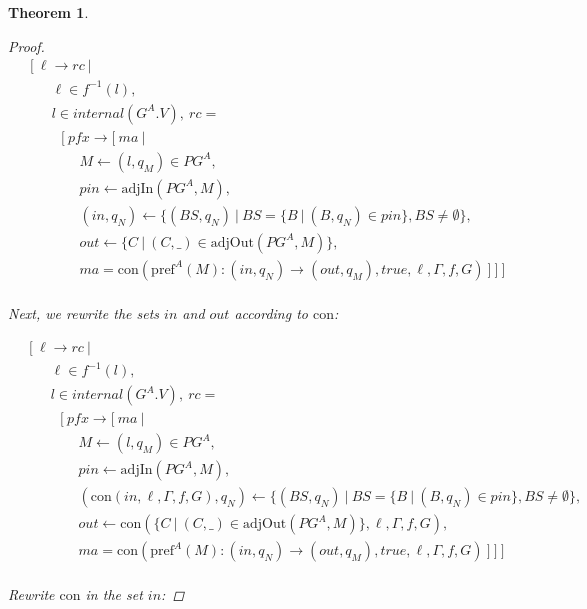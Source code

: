 \documentclass[twocolumn, openany]{sig-alternate-10pt}
\newcommand{\Con}{\mathrm{con}}
\newcommand{\Pref}{\ensuremath{\mathrm{pref}}}
\newtheorem{thm}{Theorem}
\begin{document}
\begin{thm}
\begin{proof}
      \[ \begin{array}{l}
     ~~~~~ [~ \ell \rightarrow rc ~\vert~ \\
     ~~~~~~~~~~~~ \ell \in f^{-1}(l), \\
     ~~~~~~~~~~~~ l \in internal(G^A.V), ~rc =  \\
     ~~~~~~~~~~~~~~~ [~ pfx \rightarrow [~ ma ~\vert~ \\
     ~~~~~~~~~~~~~~~~~~~~~ M \leftarrow (l,q_M) \in PG^A, \\
     ~~~~~~~~~~~~~~~~~~~~~ pin \leftarrow \text{adjIn}(PG^A,M), \\
     ~~~~~~~~~~~~~~~~~~~~~ (in,q_N) \leftarrow \{ (BS,q_N) ~\vert~ BS=\{B ~\vert~ (B,q_N) \in pin \}, BS \neq \emptyset \}, \\
     ~~~~~~~~~~~~~~~~~~~~~ out \leftarrow \{ C ~\vert~ (C,\_) \in \text{adjOut}(PG^A,M) \}, \\
     ~~~~~~~~~~~~~~~~~~~~~ ma = \Con(\Pref^A(M) : (in,q_N) \rightarrow (out,q_M), true, \ell, \Gamma, f, G) ~] ~] ~] \\
    \end{array} \]%

    Next, we rewrite the sets $in$ and $out$ according to $\Con$:

      \[ \begin{array}{l}
     ~~~~~ [~ \ell \rightarrow rc ~\vert~ \\
     ~~~~~~~~~~~~ \ell \in f^{-1}(l), \\
     ~~~~~~~~~~~~ l \in internal(G^A.V), ~rc =  \\
     ~~~~~~~~~~~~~~~ [~ pfx \rightarrow [~ ma ~\vert~ \\
     ~~~~~~~~~~~~~~~~~~~~~ M \leftarrow (l,q_M) \in PG^A, \\
     ~~~~~~~~~~~~~~~~~~~~~ pin \leftarrow \text{adjIn}(PG^A,M), \\
     ~~~~~~~~~~~~~~~~~~~~~ (\Con(in,\ell,\Gamma,f,G),q_N) \leftarrow \{ (BS,q_N) ~\vert~ BS=\{B ~\vert~ (B,q_N) \in pin \}, BS \neq \emptyset \}, \\
     ~~~~~~~~~~~~~~~~~~~~~ out \leftarrow \Con(\{ C ~\vert~ (C,\_) \in \text{adjOut}(PG^A,M) \}, \ell,\Gamma,f,G), \\
     ~~~~~~~~~~~~~~~~~~~~~ ma = \Con(\Pref^A(M) : (in,q_N) \rightarrow (out,q_M), true, \ell, \Gamma, f, G) ~] ~] ~] \\
  \end{array} \]%

  Rewrite $\Con$ in the set $in$:


\end{proof}
\end{thm}
\end{document}
